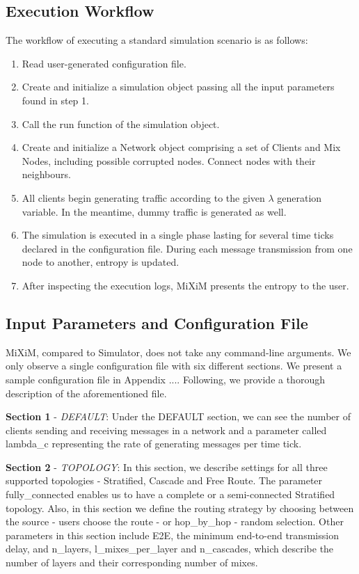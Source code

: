 \documentclass[logo,msc,cyber]{infthesis}   %
\begin{document}
\subsection{Execution Workflow}

The workflow of executing a standard simulation scenario is as follows:

\begin{enumerate}
    \item Read user-generated configuration file.
    \item Create and initialize a simulation object passing all the input
    parameters found in step 1.
    \item Call the run function of the simulation object.
    \item Create and initialize a Network object comprising a set of Clients and
    Mix Nodes, including possible corrupted nodes. Connect nodes with their
    neighbours.
    \item All clients begin generating traffic according to the given $\lambda$
    generation variable. In the meantime, dummy traffic is generated as well.
    \item The simulation is executed in a single phase lasting for several time
    ticks declared in the configuration file. During each message transmission
    from one node to another, entropy is updated.
    \item After inspecting the execution logs, MiXiM presents the entropy to the user.
\end{enumerate}

\subsection{Input Parameters and Configuration File}

MiXiM, compared to Simulator, does not take any command-line arguments. We only
observe a single configuration file with six different sections. We present a
sample configuration file in Appendix .... Following, we provide a thorough
description of the aforementioned file.

\textbf{Section 1} - \emph{DEFAULT}: Under the DEFAULT section, we can
see the number of clients sending and receiving messages in a network and a
parameter called lambda\_c representing the rate of generating messages per
time tick. 

\textbf{Section 2} - \emph{TOPOLOGY}: In this section, we describe settings for
all three supported topologies - Stratified, Cascade and Free Route. The
parameter fully\_connected enables us to have a complete or a semi-connected
Stratified topology. Also, in this section we define the routing strategy by
choosing between the source - users choose the route - or hop\_by\_hop - random
selection. Other parameters in this section include E2E, the minimum end-to-end
transmission delay, and n\_layers, l\_mixes\_per\_layer and n\_cascades, which
describe the number of layers and their corresponding number of mixes.
\end{document}
